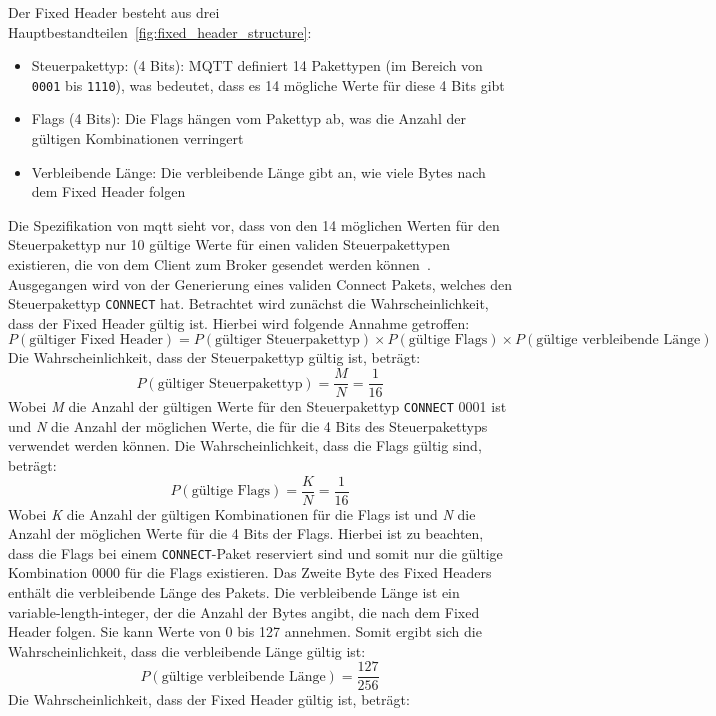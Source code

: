 Der Fixed Header besteht aus drei Hauptbestandteilen~\ref{fig:fixed_header_structure}:
\begin{itemize}
    \item Steuerpakettyp: (4 Bits): MQTT definiert 14 Pakettypen (im Bereich von \texttt{0001} bis \texttt{1110}), was
    bedeutet, dass es 14 mögliche Werte für diese 4 Bits gibt
    \item Flags (4 Bits): Die Flags hängen vom Pakettyp ab, was die Anzahl der gültigen Kombinationen verringert
    \item Verbleibende Länge: Die verbleibende Länge gibt an, wie viele Bytes nach dem Fixed Header folgen
\end{itemize}
Die Spezifikation von \gls{mqtt} sieht vor, dass von den 14 möglichen Werten für den Steuerpakettyp nur 10 gültige Werte
für einen validen Steuerpakettypen existieren, die von dem Client zum Broker gesendet werden können~\cite{mqtt-fixed-header}.
Ausgegangen wird von der Generierung eines validen Connect Pakets, welches den Steuerpakettyp \texttt{CONNECT} hat.
Betrachtet wird zunächst die Wahrscheinlichkeit, dass der Fixed Header gültig ist.
Hierbei wird folgende Annahme getroffen:
\[
    P(\text{gültiger Fixed Header}) = P(\text{gültiger Steuerpakettyp}) \times P(\text{gültige Flags}) \times P(\text{gültige verbleibende Länge})
\]
Die Wahrscheinlichkeit, dass der Steuerpakettyp gültig ist, beträgt:
\[
    P(\text{gültiger Steuerpakettyp}) = \frac{M}{N} = \frac{1}{16}
\]
Wobei \textit{M} die Anzahl der gültigen Werte für den Steuerpakettyp \texttt{CONNECT} 0001 ist und \textit{N} die Anzahl der möglichen Werte, die
für die 4 Bits des Steuerpakettyps verwendet werden können.
Die Wahrscheinlichkeit, dass die Flags gültig sind, beträgt:
\[
    P(\text{gültige Flags}) = \frac{K}{N} = \frac{1}{16}
\]
Wobei \textit{K} die Anzahl der gültigen Kombinationen für die Flags ist und \textit{N} die Anzahl der möglichen Werte für die 4 Bits der Flags.
Hierbei ist zu beachten, dass die Flags bei einem \texttt{CONNECT}-Paket reserviert sind und somit nur die gültige Kombination
0000 für die Flags existieren.\newline
Das Zweite Byte des Fixed Headers enthält die verbleibende Länge des Pakets.
Die verbleibende Länge ist ein variable-length-integer, der die Anzahl der Bytes angibt, die nach dem Fixed Header folgen.
Sie kann Werte von 0 bis 127 annehmen.
Somit ergibt sich die Wahrscheinlichkeit, dass die verbleibende Länge gültig ist:
\[
    P(\text{gültige verbleibende Länge}) = \frac{127}{256}
\]
Die Wahrscheinlichkeit, dass der Fixed Header gültig ist, beträgt:
